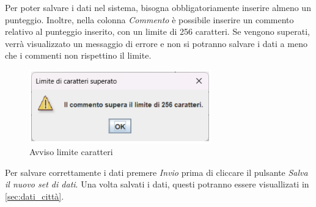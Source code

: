 Per poter salvare i dati nel sistema, bisogna obbligatoriamente inserire almeno un punteggio. Inoltre, nella colonna \emph{Commento} è possibile
inserire un commento relativo al punteggio inserito, con un limite di 256 caratteri.
Se vengono superati, verrà visualizzato un messaggio di errore e non si potranno salvare i dati a meno che i commenti non rispettino il limite.

\begin{figure}[H]
    \centering
    \includegraphics[width=0.7\textwidth]{../../img/avviso_limite_caratteri.png}
    \caption{Avviso limite caratteri}
\end{figure}

Per salvare correttamente i dati premere \emph{Invio} prima di cliccare il pulsante \emph{Salva il nuovo set di dati}.
Una volta salvati i dati, questi potranno essere visuallizati in \ref{sec:dati_città}.\\